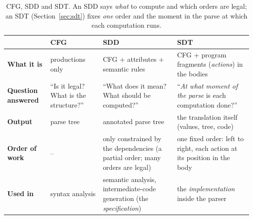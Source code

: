 \documentclass[11pt,a4paper]{article}
\begin{document}
\begin{table}[htbp]
\centering
\small
\begin{tabular}{@{}L{2.1cm} L{4.35cm} L{4.35cm} L{4.35cm}@{}}
\toprule
 & \textbf{CFG} & \textbf{SDD} & \textbf{SDT} \\ \midrule
\textbf{What it is} & productions only & CFG + attributes + semantic rules & CFG + program fragments (\emph{actions}) in the bodies \\
\textbf{Question answered} & ``Is it legal? What is the structure?'' & ``What does it mean? What should be computed?'' & ``\emph{At what moment of the parse} is each computation done?'' \\
\textbf{Output} & parse tree & annotated parse tree & the translation itself (values, tree, code) \\
\textbf{Order of work} & -- & only constrained by the dependencies (a partial order; many orders are legal) & one fixed order: left to right, each action at its position in the body \\
\textbf{Used in} & syntax analysis & semantic analysis, intermediate-code generation (the \emph{specification}) & the \emph{implementation} inside the parser \\ \bottomrule
\end{tabular}
\caption{CFG, SDD and SDT. An SDD says \emph{what} to compute and which orders are legal; an SDT (Section~\ref{sec:sdt}) fixes \emph{one} order and the moment in the parse at which each computation runs.}
\end{table}
\end{document}
